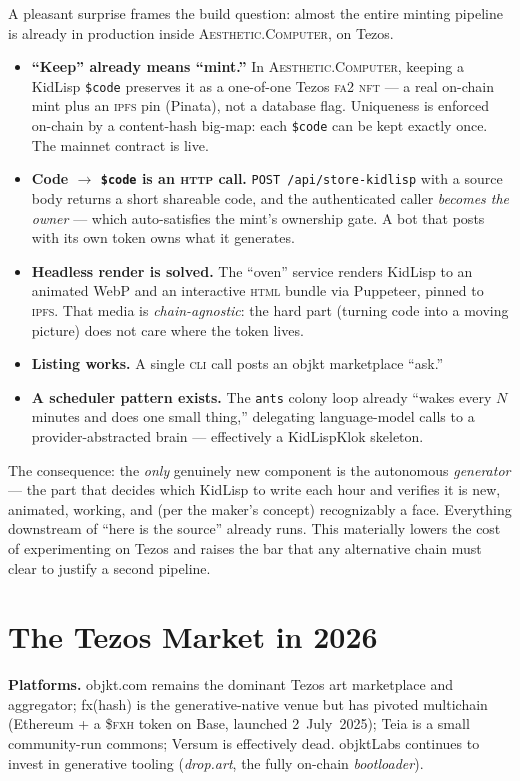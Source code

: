 \documentclass[10pt,letterpaper,twocolumn]{article}
\newcommand{\ac}{\textsc{Aesthetic.Computer}}
\begin{document}
A pleasant surprise frames the build question: almost the entire minting pipeline is already in production inside \ac{}, on Tezos.

\begin{itemize}
  \item \textbf{``Keep'' already means ``mint.''} In \ac{}, keeping a KidLisp \texttt{\$code} preserves it as a one-of-one Tezos \textsc{fa2} \textsc{nft} --- a real on-chain mint plus an \textsc{ipfs} pin (Pinata), not a database flag. Uniqueness is enforced on-chain by a content-hash big-map: each \texttt{\$code} can be kept exactly once. The mainnet contract is live.
  \item \textbf{Code $\rightarrow$ \texttt{\$code} is an \textsc{http} call.} \texttt{POST /api/store-kidlisp} with a source body returns a short shareable code, and the authenticated caller \emph{becomes the owner} --- which auto-satisfies the mint's ownership gate. A bot that posts with its own token owns what it generates.
  \item \textbf{Headless render is solved.} The ``oven'' service renders KidLisp to an animated WebP and an interactive \textsc{html} bundle via Puppeteer, pinned to \textsc{ipfs}. That media is \emph{chain-agnostic}: the hard part (turning code into a moving picture) does not care where the token lives.
  \item \textbf{Listing works.} A single \textsc{cli} call posts an objkt marketplace ``ask.''
  \item \textbf{A scheduler pattern exists.} The \texttt{ants} colony loop already ``wakes every $N$ minutes and does one small thing,'' delegating language-model calls to a provider-abstracted brain --- effectively a KidLispKlok skeleton.
\end{itemize}

The consequence: the \emph{only} genuinely new component is the autonomous \emph{generator} --- the part that decides which KidLisp to write each hour and verifies it is new, animated, working, and (per the maker's concept) recognizably a face. Everything downstream of ``here is the source'' already runs. This materially lowers the cost of experimenting on Tezos and raises the bar that any alternative chain must clear to justify a second pipeline.

\section{The Tezos Market in 2026}

\textbf{Platforms.} objkt.com remains the dominant Tezos art marketplace and aggregator; fx(hash) is the generative-native venue but has pivoted multichain (Ethereum + a \$\textsc{fxh} token on Base, launched 2~July~2025); Teia is a small community-run commons; Versum is effectively dead. objktLabs continues to invest in generative tooling (\emph{drop.art}, the fully on-chain \emph{bootloader}).
\end{document}
